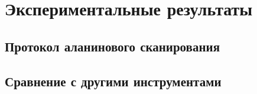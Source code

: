 \chapter{Экспериментальные результаты}
\section{Протокол аланинового сканирования}
\section{Сравнение с другими инструментами}



